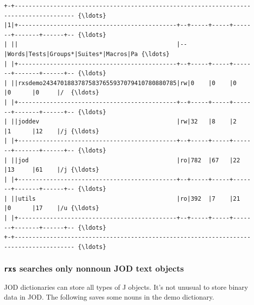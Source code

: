 \documentclass[11pt,letter,landscape]{article}
\begin{document}
    \begin{Verbatim}[commandchars=\\\{\}]
+-+--------------------------------------------------------------------------------------- {\ldots} 
|1|+---------------------------------------------+--+-----+-----+-------+-------+------+-- {\ldots} 
| ||                                             |--|Words|Tests|Groups*|Suites*|Macros|Pa {\ldots} 
| |+---------------------------------------------+--+-----+-----+-------+-------+------+-- {\ldots} 
| ||rxsdemo24347018837875837655937079410780880785|rw|0    |0    |0      |0      |0     |/  {\ldots} 
| |+---------------------------------------------+--+-----+-----+-------+-------+------+-- {\ldots} 
| ||joddev                                       |rw|32   |8    |2      |1      |12    |/j {\ldots} 
| |+---------------------------------------------+--+-----+-----+-------+-------+------+-- {\ldots} 
| ||jod                                          |ro|782  |67   |22     |13     |61    |/j {\ldots} 
| |+---------------------------------------------+--+-----+-----+-------+-------+------+-- {\ldots} 
| ||utils                                        |ro|392  |7    |21     |0      |17    |/u {\ldots} 
| |+---------------------------------------------+--+-----+-----+-------+-------+------+-- {\ldots} 
+-+--------------------------------------------------------------------------------------- {\ldots} 

    \end{Verbatim}

    \subsubsection{\texorpdfstring{\texttt{rxs} searches only nonnoun JOD
text
objects}{rxs searches only nonnoun JOD text objects}}\label{rxs-searches-only-nonnoun-jod-text-objects}

JOD dictionaries can store all types of J objects. It's not unusual to
store binary data in JOD. The following saves some nouns in the demo
dictionary.
\end{document}
